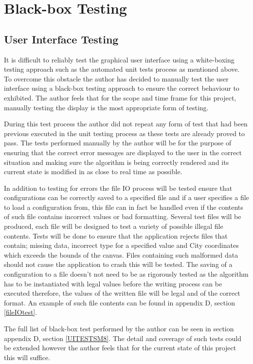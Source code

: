 \section{Black-box Testing}
\subsection{User Interface Testing}

It is difficult to reliably test the graphical user interface using a white-boxing testing approach such as the automated unit tests process as mentioned above. To overcome this obstacle the author has decided to manually test the user interface using a black-box testing approach to ensure the correct behaviour to exhibited. The author feels that for the scope and time frame for this project, manually testing the display is the most appropriate form of testing.

During this test process the author did not repeat any form of test that had been previous executed in the unit testing process as these tests are already proved to pass. The tests performed manually by the author will be for the purpose of ensuring that the correct error messages are displayed to the user in the correct situation and making sure the algorithm is being correctly rendered and its current state is modified in as close to real time as possible. 

In addition to testing for errors the file IO process will be tested ensure that configurations can be correctly saved to a specified file and if a user specifies a file to load a configuration from, this file can in fact be handled even if the contents of such file contains incorrect values or bad formatting. Several test files will be produced, each file will be designed to test a variety of possible illegal file contents. Tests will be done to ensure that the application rejects files that contain; missing data, incorrect type for a specified value and City coordinates which exceeds the bounds of the canvas. Files containing such malformed data should not cause the application to crash this will be tested. The saving of a configuration to a file doesn’t not need to be as rigorously tested as the algorithm has to be instantiated with legal values before the writing process can be executed therefore, the values of the written file will be legal and of the correct format. An example of such file contents can be found in appendix D, section \ref{fileIOtest}.

The full list of black-box test performed by the author can be seen in section appendix D, section \ref{UITESTSM8}. The detail and coverage of such tests could be extended however the author feels that for the current state of this project this will suffice.

